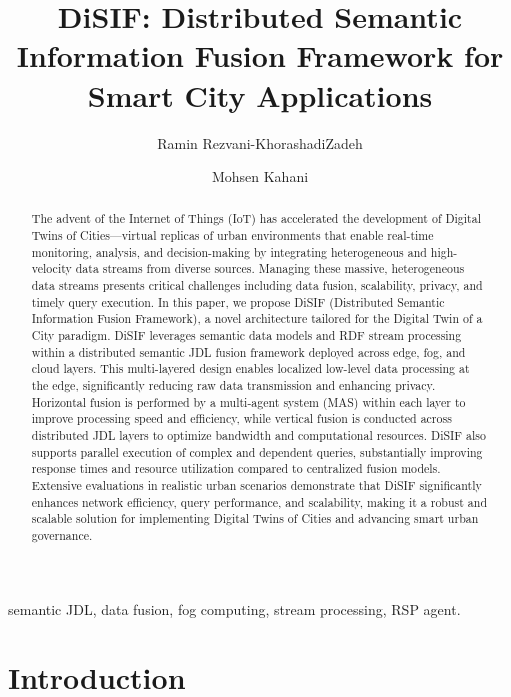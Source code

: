 \documentclass[5p,times]{elsarticle}
\begin{document}
\begin{frontmatter}
\title{DiSIF: Distributed Semantic Information Fusion Framework for Smart City Applications}
\author{Ramin Rezvani-KhorashadiZadeh}
\author{Mohsen Kahani}
\address{Department of Computer Engineering, Ferdowsi University of Mashhad, Mashhad, Iran }
\begin{abstract}
  The advent of the Internet of Things (IoT) has accelerated the development of Digital Twins of Cities—virtual replicas of urban
 environments that enable real-time monitoring, analysis, and decision-making by integrating heterogeneous and high-velocity data
 streams from diverse sources. Managing these massive, heterogeneous data streams presents critical challenges including data
 fusion, scalability, privacy, and timely query execution. In this paper, we propose DiSIF (Distributed Semantic Information Fusion
 Framework), a novel architecture tailored for the Digital Twin of a City paradigm. DiSIF leverages semantic data models and
 RDF stream processing within a distributed semantic JDL fusion framework deployed across edge, fog, and cloud layers. This
 multi-layered design enables localized low-level data processing at the edge, significantly reducing raw data transmission and
 enhancing privacy. Horizontal fusion is performed by a multi-agent system (MAS) within each layer to improve processing speed and efficiency, while vertical fusion is conducted across distributed JDL layers to optimize bandwidth and computational resources.
  DiSIF also supports parallel execution of
 complex and dependent queries, substantially improving response times and resource utilization compared to centralized fusion
 models. Extensive evaluations in realistic urban scenarios demonstrate that DiSIF significantly enhances network efficiency, query
 performance, and scalability, making it a robust and scalable solution for implementing Digital Twins of Cities and advancing smart
 urban governance.

\end{abstract}
\begin{keyword}
semantic JDL, data fusion, fog computing, stream processing, RSP agent.
\end{keyword}
\end{frontmatter}
\section{Introduction}
\end{document}
